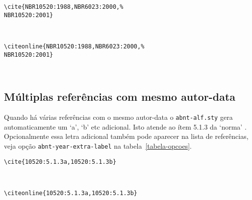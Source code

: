 \documentclass[espacosimples]{abnt}
\newcommand{\VerbL}{0.54\textwidth}
\newcommand{\LatL}{0.45\textwidth}
\begin{document}
\noindent\begin{minipage}[t]{\VerbL}\small\begin{verbatim}
\cite{NBR10520:1988,NBR6023:2000,%
NBR10520:2001}
\end{verbatim}\end{minipage}\begin{minipage}[t]{\LatL}\small
\cite{NBR10520:1988,NBR6023:2000,%
NBR10520:2001}
\end{minipage}\vspace{5mm}\\

\noindent\begin{minipage}[t]{\VerbL}\small\begin{verbatim}
\citeonline{NBR10520:1988,NBR6023:2000,%
NBR10520:2001}
\end{verbatim}\end{minipage}\begin{minipage}[t]{\LatL}\small
{}
\end{minipage}\vspace{5mm}\\

\subsection{Múltiplas referências com mesmo autor-data}
\label{mult-abc}
Quando há várias referências com o mesmo autor-data o {\tt abnt-alf.sty}
gera automaticamente um `a', `b' etc adicional. Isto atende ao ítem
5.1.3 da `norma' \cite{NBR10520:2001}.
Opcionalmente essa letra adicional também pode aparecer na lista de
referências, veja opção {\tt abnt-year-extra-label} na tabela~\ref{tabela-opcoes}.

\noindent\begin{minipage}[t]{\VerbL}\small\begin{verbatim}
\cite{10520:5.1.3a,10520:5.1.3b}
\end{verbatim}\end{minipage}\begin{minipage}[t]{\LatL}\small
\cite{10520:5.1.3a,10520:5.1.3b}
\end{minipage}\vspace{5mm}\\

\noindent\begin{minipage}[t]{\VerbL}\small\begin{verbatim}
\citeonline{10520:5.1.3a,10520:5.1.3b}
\end{verbatim}\end{minipage}\begin{minipage}[t]{\LatL}\small
{}
\end{minipage}\vspace{5mm}\\
\end{document}
